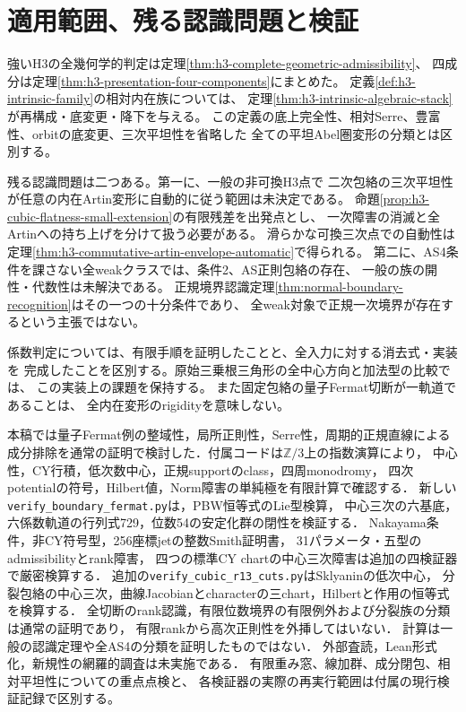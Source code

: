 \documentclass[11pt,a4paper]{ltjsarticle}
\theoremstyle{definition}\newtheorem{definition}[theorem]{定義}
\begin{document}
\section{適用範囲、残る認識問題と検証}
強いH3の全幾何学的判定は定理\ref{thm:h3-complete-geometric-admissibility}、
四成分は定理\ref{thm:h3-presentation-four-components}にまとめた。
定義\ref{def:h3-intrinsic-family}の相対内在族については、
定理\ref{thm:h3-intrinsic-algebraic-stack}が再構成・底変更・降下を与える。
この定義の底上完全性、相対Serre、豊富性、orbitの底変更、三次平坦性を省略した
全ての平坦Abel圏変形の分類とは区別する。

残る認識問題は二つある。第一に、一般の非可換H3点で
二次包絡の三次平坦性が任意の内在Artin変形に自動的に従う範囲は未決定である。
命題\ref{prop:h3-cubic-flatness-small-extension}の有限残差を出発点とし、
一次障害の消滅と全Artinへの持ち上げを分けて扱う必要がある。
滑らかな可換三次点での自動性は
定理\ref{thm:h3-commutative-artin-envelope-automatic}で得られる。
第二に、AS4条件を課さない全weakクラスでは、条件2、AS正則包絡の存在、
一般の族の開性・代数性は未解決である。
正規境界認識定理\ref{thm:normal-boundary-recognition}はその一つの十分条件であり、
全weak対象で正規一次境界が存在するという主張ではない。

係数判定については、有限手順を証明したことと、全入力に対する消去式・実装を
完成したことを区別する。原始三乗根三角形の全中心方向と加法型の比較では、
この実装上の課題を保持する。
また固定包絡の量子Fermat切断が一軌道であることは、
全内在変形のrigidityを意味しない。

本稿では量子Fermat例の整域性，局所正則性，Serre性，周期的正規直線による
成分排除を通常の証明で検討した．付属コードは$\mathbb Z/3$上の指数演算により，
中心性，CY行積，低次数中心，正規supportのclass，四周monodromy，
四次potentialの符号，Hilbert値，Norm障害の単純極を有限計算で確認する．
新しい\texttt{verify\_boundary\_fermat.py}は，PBW恒等式のLie型検算，
中心三次の六基底，六係数軌道の行列式729，位数54の安定化群の閉性を検証する．
Nakayama条件，非CY符号型，256座標jetの整数Smith証明書，
31パラメータ・五型のadmissibilityとrank障害，
四つの標準CY chartの中心三次障害は追加の四検証器で厳密検算する．
追加の\texttt{verify\_cubic\_r13\_cuts.py}はSklyaninの低次中心，
分裂包絡の中心三次，曲線Jacobianとcharacterの三chart，Hilbertと作用の恒等式を検算する．
全切断のrank認識，有限位数境界の有限例外および分裂族の分類は通常の証明であり，
有限rankから高次正則性を外挿してはいない．
計算は一般の認識定理や全AS4の分類を証明したものではない．
外部査読，Lean形式化，新規性の網羅的調査は未実施である．
有限重み窓、線加群、成分閉包、相対平坦性についての重点点検と、
各検証器の実際の再実行範囲は付属の現行検証記録で区別する。
\end{document}
